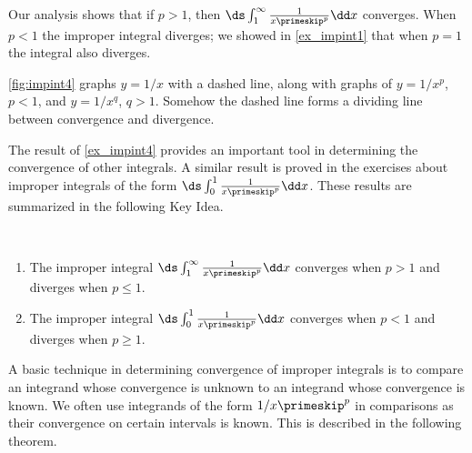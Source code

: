 \begin{example}
Our analysis shows that if $p>1$, then $\ds\int_1^\infty \frac1{x\primeskip^p}\dd x $ converges. When $p<1$ the improper integral diverges; we showed in \autoref{ex_impint1} that when $p=1$ the integral also diverges. 

\autoref{fig:impint4} graphs $y=1/x$ with a dashed line, along with graphs of $y=1/x^p$, $p<1$, and $y=1/x^q$, $q>1$. Somehow the dashed line forms a dividing line between convergence and divergence. %
\end{example}

The result of \autoref{ex_impint4} provides an important tool in determining the convergence of other integrals. A similar result is proved in the exercises about improper integrals of the form $\ds \int_0^1\frac1{x\primeskip^p}\dd x$. These results are summarized in the following Key Idea.

{
\begin{keyidea}\label{idea:impint1}
\mbox{}\\[-1.5\baselineskip]\parbox[t]{\linewidth}{%
\begin{enumerate}
\item		The improper integral $\ds \int_1^\infty\frac1{x\primeskip^p}\dd x$ converges when $p>1$ and diverges when $p\leq 1.$
\item		The improper integral $\ds \int_0^1\frac1{x\primeskip^p}\dd x$ converges when $p<1$ and diverges when $p\geq 1.$
\end{enumerate}}
\end{keyidea}}

A basic technique in determining convergence of improper integrals is to compare an integrand whose convergence is unknown to an integrand whose convergence is known. We often use integrands of the form $1/x\primeskip^p$ in comparisons as their convergence on certain intervals is known. This is described in the following theorem.



